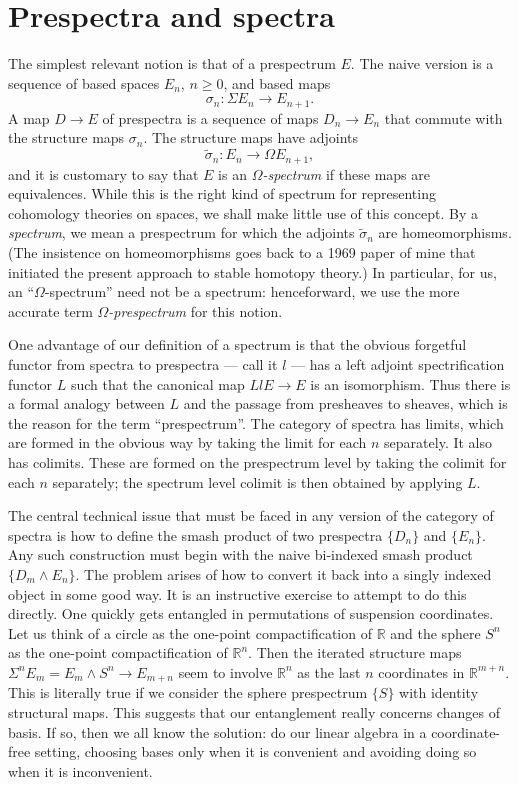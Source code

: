 \section{Prespectra and spectra}

The simplest relevant notion is that of a prespectrum $E$. The naive version is a sequence of based spaces $E_n$, $n \ge 0$, and based maps
\[ \sigma_n: \Sigma E_n \longrightarrow E_{n+1}. \]
A map $D \longrightarrow E$ of prespectra is a sequence of maps $D_n \longrightarrow E_n$ that commute with the structure maps $\sigma_n$. The structure maps have adjoints
\[ \tilde{\sigma}_n: E_n \longrightarrow \Omega E_{n+1}, \]
and it is customary to say that $E$ is an \emph{$\Omega$-spectrum} if these maps are equivalences. While this is the right kind of spectrum for representing cohomology theories on spaces, we shall make little use of this concept. By a \emph{spectrum}, we mean a prespectrum for which the adjoints $\tilde{\sigma}_n$ are homeomorphisms. (The insistence on homeomorphisms goes back to a 1969 paper of mine that initiated the present approach to stable homotopy theory.) In particular, for us, an ``$\Omega$-spectrum'' need not be a spectrum: henceforward, we use the more accurate term \emph{$\Omega$-prespectrum} for this notion.

One advantage of our definition of a spectrum is that the obvious forgetful functor from spectra to prespectra --- call it $l$ --- has a left adjoint spectrification functor $L$ such that the canonical map $LlE \longrightarrow E$ is an isomorphism. Thus there is a formal analogy between $L$ and the passage from presheaves to sheaves, which is the reason for the term ``prespectrum''. The category of spectra has limits, which are formed in the obvious way by taking the limit for each $n$ separately. It also has colimits. These are formed on the prespectrum level by taking the colimit for each $n$ separately; the spectrum level colimit is then obtained by applying $L$.

The central technical issue that must be faced in any version of the category of spectra is how to define the smash product of two prespectra $\{D_n\}$ and $\{E_n\}$. Any such construction must begin with the naive bi-indexed smash product $\{D_m \wedge E_n\}$. The problem arises of how to convert it back into a singly indexed object in some good way. It is an instructive exercise to attempt to do this directly. One quickly gets entangled in permutations of suspension coordinates. Let us think of a circle as the one-point compactification of $\mathbb{R}$ and the sphere $S^n$ as the one-point compactification of $\mathbb{R}^n$. Then the iterated structure maps $\Sigma^n E_m = E_m \wedge S^n \longrightarrow E_{m+n}$ seem to involve $\mathbb{R}^n$ as the last $n$ coordinates in $\mathbb{R}^{m+n}$. This is literally true if we consider the sphere prespectrum $\{S\}$ with identity structural maps. This suggests that our entanglement really concerns changes of basis. If so, then we all know the solution: do our linear algebra in a coordinate-free setting, choosing bases only when it is convenient and avoiding doing so when it is inconvenient.

